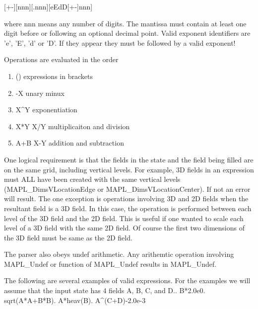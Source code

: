 [+\textbar-][nnn][.nnn][e\textbar E\textbar d\textbar D[+\textbar-]nnn]

where nnn means any number of digits. The mantissa must contain at least
one digit before or following an optional decimal point. Valid exponent
identifiers are 'e', 'E', 'd' or 'D'. If they appear they must be followed
by a valid exponent!

Operations are evaluated in the order
\begin{enumerate}
\item ()      expressions in brackets
\item -X      unary minux
\item X\^{}Y  exponentiation
\item X*Y X/Y multiplicaiton and division
\item A+B X-Y addition and subtraction
\end{enumerate}

One logical requirement is that the fields in the state and the field being filled are on the same grid,
including vertical levels. For example, 3D fields in an expression must ALL have been created with
the same vertical levels (MAPL\_DimsVLocationEdge or MAPL\_DimsVLocationCenter). If not an error will result.
The one exception is operations involving 3D and 2D fields when
the resultant field is a 3D field. In this case, the operation is performed between each level
of the 3D field and the 2D field. This is useful if one wanted to scale each level of a 3D
field with the same 2D field. Of course the first two dimensions of the 3D field must be same as the 2D field.

The parser also obeys undef arithmetic. Any arithemtic operation involving MAPL\_Undef or function of MAPL\_Undef
results in MAPL\_Undef.

The following are several examples of valid expressions. For the examples we will assume that the input state
has 4 fields A, B, C, and D.. B*2.0e0. sqrt(A*A+B*B). A*heav(B). A\^{}(C+D)-2.0e-3
